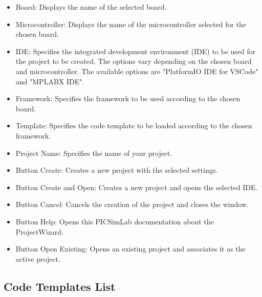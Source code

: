 \begin{itemize}
\item Board: Displays the name of the selected board.

\item Microcontroller: Displays the name of the microcontroller selected for the chosen board.

\item IDE: Specifies the integrated development environment (IDE) to be used for the project to be created. The options vary depending on the chosen board and microcontroller. The available options are "PlatformIO IDE for VSCode" and "MPLABX IDE".
\item Framework: Specifies the framework to be used according to the chosen board.

\item Template: Specifies the code template to be loaded according to the chosen framework.
\item Project Name: Specifies the name of your project.
\item Button Create: Creates a new project with the selected settings.

\item Button Create and Open: Creates a new project and opens the selected IDE.

\item Button Cancel: Cancels the creation of the project and closes the window.

\item Button Help: Opens this PICSimLab documentation about the ProjectWizard.

\item Button Open Existing: Opens an existing project and associates it as the active project.
\end{itemize}



\subsection{Code Templates List}

